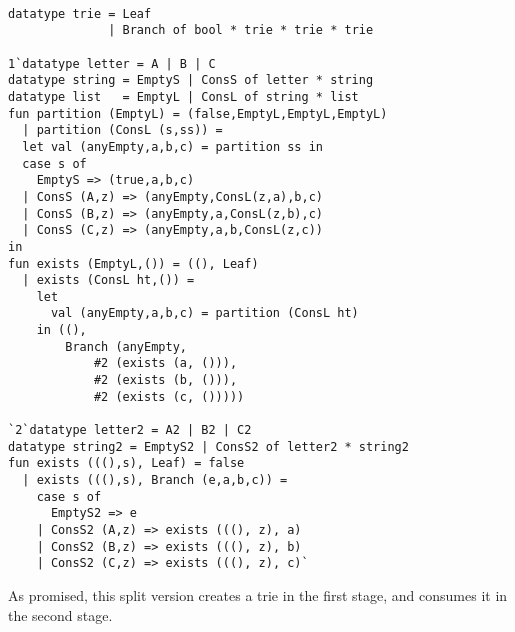 \begin{lstlisting} 

datatype trie = Leaf 
			  | Branch of bool * trie * trie * trie

1`datatype letter = A | B | C 
datatype string = EmptyS | ConsS of letter * string
datatype list   = EmptyL | ConsL of string * list
fun partition (EmptyL) = (false,EmptyL,EmptyL,EmptyL) 
  | partition (ConsL (s,ss)) = 
  let val (anyEmpty,a,b,c) = partition ss in 
  case s of 
    EmptyS => (true,a,b,c) 
  | ConsS (A,z) => (anyEmpty,ConsL(z,a),b,c) 
  | ConsS (B,z) => (anyEmpty,a,ConsL(z,b),c) 
  | ConsS (C,z) => (anyEmpty,a,b,ConsL(z,c)) 
in
fun exists (EmptyL,()) = ((), Leaf)
  | exists (ConsL ht,()) =
	let 
	  val (anyEmpty,a,b,c) = partition (ConsL ht) 
	in ((), 
		Branch (anyEmpty, 
			#2 (exists (a, ())), 
			#2 (exists (b, ())), 
			#2 (exists (c, ()))))

`2`datatype letter2 = A2 | B2 | C2
datatype string2 = EmptyS2 | ConsS2 of letter2 * string2
fun exists (((),s), Leaf) = false
  | exists (((),s), Branch (e,a,b,c)) = 
    case s of
	  EmptyS2 => e
	| ConsS2 (A,z) => exists (((), z), a)
	| ConsS2 (B,z) => exists (((), z), b)
	| ConsS2 (C,z) => exists (((), z), c)`

\end{lstlisting}

As promised, this split version creates a trie in the first stage, and consumes it in the second stage.
